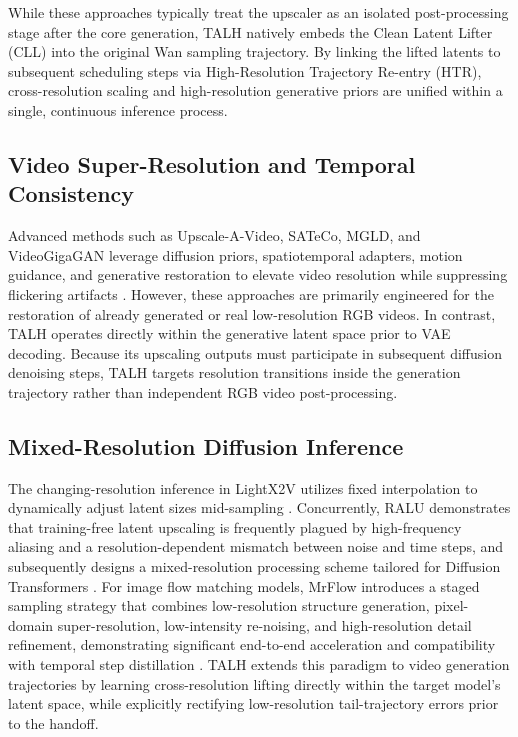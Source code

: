 While these approaches typically treat the upscaler as an isolated
post-processing stage after the core generation, TALH natively embeds
the Clean Latent Lifter (CLL) into the original Wan sampling trajectory.
By linking the lifted latents to subsequent scheduling steps via
High-Resolution Trajectory Re-entry (HTR), cross-resolution scaling and
high-resolution generative priors are unified within a single,
continuous inference process.

\subsection{Video Super-Resolution and Temporal Consistency}

Advanced methods such as Upscale-A-Video, SATeCo, MGLD, and VideoGigaGAN
leverage diffusion priors, spatiotemporal adapters, motion guidance, and
generative restoration to elevate video resolution while suppressing
flickering artifacts
\citep{zhou2024upscale, chen2024sateco, yang2024mgld, xu2024videogigagan}.
However, these approaches are primarily engineered for the restoration
of already generated or real low-resolution RGB videos. In contrast,
TALH operates directly within the generative latent space prior to VAE
decoding. Because its upscaling outputs must participate in subsequent
diffusion denoising steps, TALH targets resolution transitions inside
the generation trajectory rather than independent RGB video
post-processing.

\subsection{Mixed-Resolution Diffusion Inference}

The changing-resolution inference in LightX2V utilizes fixed
interpolation to dynamically adjust latent sizes mid-sampling
\citep{lightx2v2026}. Concurrently, RALU demonstrates that training-free
latent upscaling is frequently plagued by high-frequency aliasing and a
resolution-dependent mismatch between noise and time steps, and
subsequently designs a mixed-resolution processing scheme tailored for
Diffusion Transformers \citep{jeong2025ralu}. For image flow matching
models, MrFlow introduces a staged sampling strategy that combines
low-resolution structure generation, pixel-domain super-resolution,
low-intensity re-noising, and high-resolution detail refinement,
demonstrating significant end-to-end acceleration and compatibility with
temporal step distillation \citep{zheng2026mrflow}. TALH extends this
paradigm to video generation trajectories by learning cross-resolution
lifting directly within the target model's latent space, while
explicitly rectifying low-resolution tail-trajectory errors prior to the
handoff.

